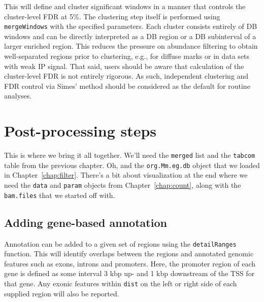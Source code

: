 \documentclass[12pt]{report}
\newcommand{\code}[1]{{\small\texttt{#1}}}
\newenvironment{combox}
{ \begin{shaded}\begin{center}\begin{minipage}[t]{0.95\textwidth} }
{ \end{minipage}\end{center}\end{shaded} }
\begin{document}
This will define and cluster significant windows in a manner that controls the cluster-level FDR at 5\%.
The clustering step itself is performed using \code{mergeWindows} with the specified parameters.
Each cluster consists entirely of DB windows and can be directly interpreted as a DB region or a DB subinterval of a larger enriched region.
This reduces the pressure on abundance filtering to obtain well-separated regions prior to clustering, e.g., for diffuse marks or in data sets with weak IP signal.
That said, users should be aware that calculation of the cluster-level FDR is not entirely rigorous.
As such, independent clustering and FDR control via Simes' method should be considered as the default for routine analyses.



\chapter{Post-processing steps}

\begin{combox}
This is where we bring it all together.
We'll need the \code{merged} list and the \code{tabcom} table from the previous chapter. 
Oh, and the \code{org.Mm.eg.db} object that we loaded in Chapter~\ref{chap:filter}.
There's a bit about visualization at the end where we need the \code{data} and \code{param} objects from Chapter~\ref{chap:count}, along with the \code{bam.files} that we started off with.
\end{combox}

\section{Adding gene-based annotation}
Annotation can be added to a given set of regions using the \code{detailRanges} function. 
This will identify overlaps between the regions and annotated genomic features such as exons, introns and promoters. 
Here, the promoter region of each gene is defined as some interval 3 kbp up- and 1 kbp downstream of the TSS for that gene. 
Any exonic features within \code{dist} on the left or right side of each supplied region will also be reported.
\end{document}
